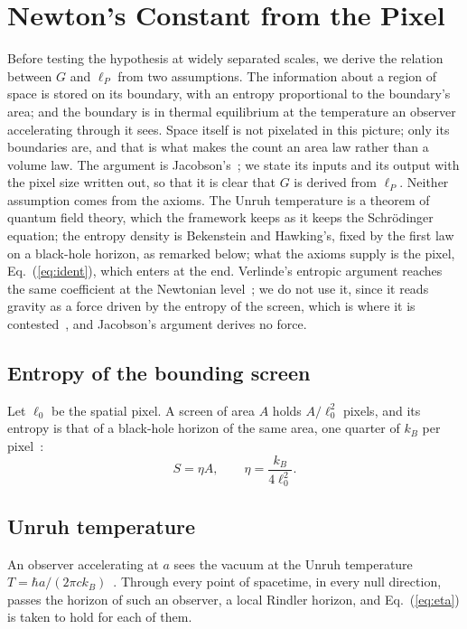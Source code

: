 \documentclass[aps,prd,twocolumn,superscriptaddress,nofootinbib,showkeys]{revtex4-2}
\begin{document}
\section{Newton's Constant from the Pixel}
\label{sec:pixel}

Before testing the hypothesis at widely separated scales, we derive the relation between $G$ and $\ell_P$ from two assumptions. The information about a region of space is stored on its boundary, with an entropy proportional to the boundary's area; and the boundary is in thermal equilibrium at the temperature an observer accelerating through it sees. Space itself is not pixelated in this picture; only its boundaries are, and that is what makes the count an area law rather than a volume law. The argument is Jacobson's~\cite{jacobson1995}; we state its inputs and its output with the pixel size written out, so that it is clear that $G$ is derived from $\ell_P$. Neither assumption comes from the axioms. The Unruh temperature is a theorem of quantum field theory, which the framework keeps as it keeps the Schr\"odinger equation; the entropy density is Bekenstein and Hawking's, fixed by the first law on a black-hole horizon, as remarked below; what the axioms supply is the pixel, Eq.~(\ref{eq:ident}), which enters at the end. Verlinde's entropic argument reaches the same coefficient at the Newtonian level~\cite{verlinde2011}; we do not use it, since it reads gravity as a force driven by the entropy of the screen, which is where it is contested~\cite{visser2011,kobakhidze2011}, and Jacobson's argument derives no force.

\subsection{Entropy of the bounding screen}
Let $\ell_0$ be the spatial pixel. A screen of area $A$ holds $A/\ell_0^2$ pixels, and its entropy is that of a black-hole horizon of the same area, one quarter of $k_B$ per pixel~\cite{bekenstein1973}:
\begin{equation}
S = \eta A,\qquad \eta = \frac{k_B}{4\ell_0^2}.
\label{eq:eta}
\end{equation}

\subsection{Unruh temperature}
An observer accelerating at $a$ sees the vacuum at the Unruh temperature $T = \hbar a/(2\pi c k_B)$~\cite{unruh1976}. Through every point of spacetime, in every null direction, passes the horizon of such an observer, a local Rindler horizon, and Eq.~(\ref{eq:eta}) is taken to hold for each of them.
\end{document}
